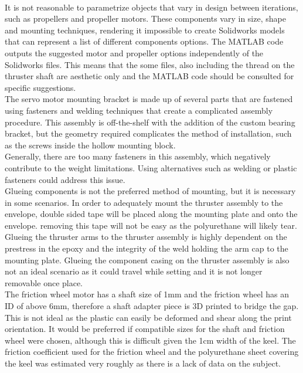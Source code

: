 \documentclass[../main.tex]{subfiles}
\begin{document}
\\
It is not reasonable to parametrize objects that vary in design between iterations, such as propellers and propeller motors. These components vary in size, shape and mounting techniques, rendering it impossible to create Solidworks models that can represent a list of different components options. The MATLAB code outputs the suggested motor and propeller options independently of the Solidworks files. This means that the some files, also including the thread on the thruster shaft are aesthetic only and the MATLAB code should be consulted for specific suggestions.
\\
The servo motor mounting bracket is made up of several parts that are fastened using fasteners and welding techniques that create a complicated assembly procedure. This assembly is off-the-shelf with the addition of the custom bearing bracket, but the geometry required complicates the method of installation, such as the screws inside the hollow mounting block.
\\
Generally, there are too many fasteners in this assembly, which negatively contribute to the weight limitations. Using alternatives such as welding or plastic fasteners could address this issue. 
\\
Glueing components is not the preferred method of mounting, but it is necessary in some scenarios. In order to adequately mount the thruster assembly to the envelope, double sided tape will be placed along the mounting plate and onto the envelope. removing this tape will not be easy as the polyurethane will likely tear. Glueing the thruster arms to the thruster assembly is highly dependent on the prestress in the epoxy and the integrity of the weld holding the arm cap to the mounting plate. Glueing the component casing on the thruster assembly is also not an ideal scenario as it could travel while setting and it is not longer removable once place.
\\
The friction wheel motor has a shaft size of 1mm and the friction wheel has an ID of above 6mm, therefore a shaft adapter piece is 3D printed to bridge the gap. This is not ideal as the plastic can easily be deformed and shear along the print orientation. It would be preferred if compatible sizes for the shaft and friction wheel were chosen, although this is difficult given the 1cm width of the keel. The friction coefficient used for the friction wheel and the polyurethane sheet covering the keel was estimated very roughly as there is a lack of data on the subject.
\\
\end{document}
